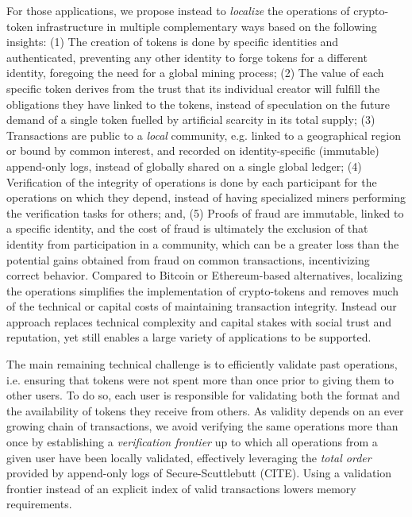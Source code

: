 \documentclass[sigplan,screen,10pt]{acmart}
\begin{document}
For those applications, we propose instead to \textit{localize} the operations of crypto-token infrastructure in multiple complementary ways based on the following insights: (1) The creation of tokens is done by specific identities and authenticated, preventing any other identity to forge tokens for a different identity, foregoing the need for a global mining process; (2) The value of each specific token derives from the trust that its individual creator will fulfill the obligations they have linked to the tokens, instead of speculation on the future demand of a single token fuelled by artificial scarcity in its total supply; (3) Transactions are public to a \textit{local} community, e.g. linked to a geographical region or bound by common interest, and recorded on identity-specific (immutable) append-only logs, instead of globally shared on a single global ledger; (4) Verification of the integrity of operations is done by each participant for the operations on which they depend, instead of having specialized miners performing the verification tasks for others; and, (5) Proofs of fraud are immutable, linked to a specific identity, and the cost of fraud is ultimately the exclusion of that identity from participation in a community, which can be a greater loss than the potential gains obtained from fraud on common transactions, incentivizing correct behavior. Compared to Bitcoin or Ethereum-based alternatives, localizing the operations simplifies the implementation of crypto-tokens and removes much of the technical or capital costs of maintaining transaction integrity. Instead our approach replaces technical complexity and capital stakes with social trust and reputation, yet still enables a large variety of applications to be supported.

The main remaining technical challenge is to efficiently validate past operations, i.e. ensuring that tokens were not spent more than once prior to giving them to other users. To do so, each user is responsible for validating both the format and the availability of tokens they receive from others. 
As validity depends on an ever growing chain of transactions, we avoid verifying the same operations more than once by establishing a \textit{verification frontier} up to which all operations from a given user have been locally validated, effectively leveraging the \textit{total order} provided by append-only logs of Secure-Scuttlebutt (CITE). Using a validation frontier instead of an explicit index of valid transactions lowers memory requirements.
\end{document}
